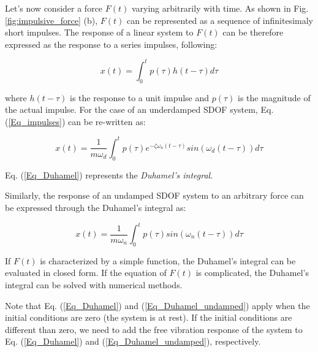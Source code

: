 \documentclass[12pt,letter]{article}
\numberwithin{ex}{section} %
\numberwithin{re}{section} %
\begin{document}
Let's now consider a force $F(t)$ varying arbitrarily with time. As shown in Fig. \ref{fig:impulsive_force} (b), $F(t)$ can be represented as a sequence of infinitesimaly short impulses. The response of a linear system to $F(t)$ can be therefore expressed as the response to a series impulses, following:

\begin{equation} \label{Eq_impulses}
x(t) = \int_{0}^{t} p(\tau) h(t - \tau) d\tau
\end{equation}

where $h(t - \tau)$ is the response to a unit impulse and $p(\tau)$ is the magnitude of the actual impulse. For the case of an underdamped SDOF system, Eq. (\ref{Eq_impulses}) can be re-written as:

\begin{equation} \label{Eq_Duhamel}
x(t) = \frac{1}{m \omega_d} \int_{0}^{t} p(\tau) e^{-\zeta \omega_n (t - \tau)} sin(\omega_d (t - \tau)) d\tau
\end{equation}

Eq. (\ref{Eq_Duhamel}) represents the \emph{Duhamel's integral}.

Similarly, the response of an undamped SDOF system to an arbitrary force can be expressed through the Duhamel's integral as:

\begin{equation} \label{Eq_Duhamel_undamped}
x(t) = \frac{1}{m \omega_n} \int_{0}^{t} p(\tau) sin(\omega_n (t - \tau)) d\tau
\end{equation}

If $F(t)$ is characterized by a simple function, the Duhamel's integral can be evaluated in closed form. If the equation of $F(t)$ is complicated, the Duhamel's integral can be solved with numerical methods.

Note that Eq. (\ref{Eq_Duhamel}) and (\ref{Eq_Duhamel_undamped}) apply when the initial conditions are zero (the system is at rest). If the initial conditions are different than zero, we need to add the free vibration response of the system to Eq. (\ref{Eq_Duhamel}) and (\ref{Eq_Duhamel_undamped}), respectively. 


\vspace{2ex}
\end{document}
